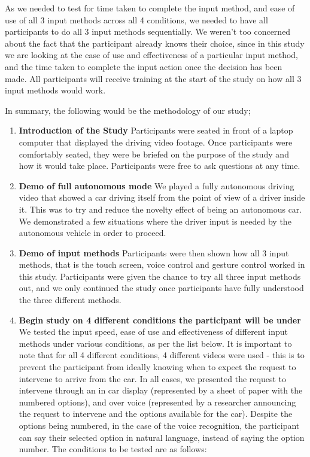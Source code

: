 \documentclass{sigchi}
\begin{document}
As we needed to test for time taken to complete the input method, and ease of use of all 3 input methods across all 4 conditions, we needed to have all participants to do all 3 input methods sequentially. We weren't too concerned about the fact that the participant already knows their choice, since in this study we are looking at the ease of use and effectiveness of a particular input method, and the time taken to complete the input action once the decision has been made. All participants will receive training at the start of the study on how all 3 input methods would work. 

In summary, the following would be the methodology of our study;

\begin{enumerate}
\item \textbf{Introduction of the Study}
\newline
Participants were seated in front of a laptop computer that displayed the driving video footage. Once participants were comfortably seated, they were be briefed on the purpose of the study and how it would take place. Participants were free to ask questions at any time.
\item \textbf{Demo of full autonomous mode}
\newline
We played a fully autonomous driving video that showed a car driving itself from the point of view of a driver inside it. This was to try and reduce the novelty effect of being an autonomous car. We demonstrated a few situations where the driver input is needed by the autonomous vehicle in order to proceed.
\item \textbf{Demo of input methods}
\newline Participants were then shown how all 3 input methods, that is the touch screen, voice control and gesture control worked in this study. Participants were  given the chance to try all three input methods out, and we only continued the study once participants have fully understood the three different methods.
\item \textbf{Begin study on 4 different conditions the participant will be under}
\newline
We tested the input speed, ease of use and effectiveness of different input methods under various conditions, as per the list below. It is important to note that for all 4 different conditions, 4 different videos were used - this is to prevent the participant from ideally knowing when to expect the request to intervene to arrive from the car. In all cases, we presented the request to intervene through an in car display (represented by a sheet of paper with the numbered options), and over voice (represented by a researcher announcing the request to intervene and the options available for the car). Despite the options being numbered, in the case of the voice recognition, the participant can say their selected option in natural language, instead of saying the option number. The conditions to be tested are as follows:

\end{enumerate}
\end{document}
